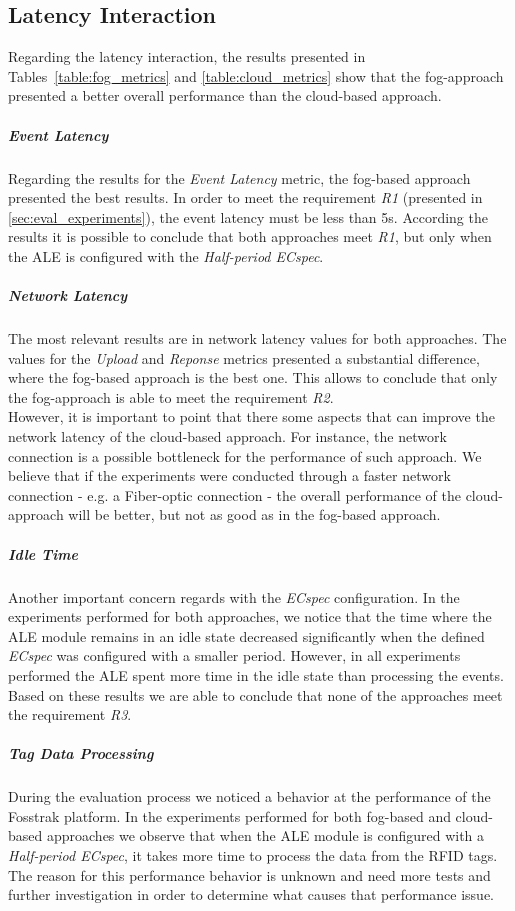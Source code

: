 \subsection{Latency Interaction}
\label{subs:eval_results_latency}
Regarding the latency interaction, the results presented in Tables~\ref{table:fog_metrics} and
\ref{table:cloud_metrics} show that the fog-approach presented a better overall performance than
the cloud-based approach.

\subparagraph{Event Latency}
\label{subp:eval_event_latency}
Regarding the results for the \textit{Event Latency} metric, the fog-based approach presented the
best results. In order to meet the requirement \textit{R1} (presented in \ref{sec:eval_experiments}),
the event latency must be less than 5s. According the results it is possible to conclude that both
approaches meet \textit{R1}, but only when the \gls{ALE} is configured with the \textit{Half-period ECspec}.

\subparagraph{Network Latency}
\label{subp:eval_network_latency}
The most relevant results are in network latency values for both approaches. The values for the \textit{Upload}
and \textit{Reponse} metrics presented a substantial difference, where the fog-based approach is the
best one. This allows to conclude that only the fog-approach is able to meet the requirement \textit{R2}.\\

However, it is important to point that there some aspects that can improve the network latency
of the cloud-based approach. For instance, the network connection is a possible bottleneck for the
performance of such approach. We believe that if the experiments were conducted through a faster
network connection - e.g. a Fiber-optic connection - the overall performance of the cloud-approach
will be better, but not as good as in the fog-based approach.

\subparagraph{Idle Time}
\label{subp:eval_idle_time}
Another important concern regards with the \textit{ECspec} configuration. In the experiments
performed for both approaches, we notice that the time where the \gls{ALE} module remains in an idle
state decreased significantly when the defined \textit{ECspec} was configured with a smaller period.
However, in all experiments performed the \gls{ALE} spent more time in the idle state than
processing the events. Based on these results we are able to conclude that none of the approaches
meet the requirement \textit{R3}.

\subparagraph{Tag Data Processing}
\label{subp:eval_tag_processing}
During the evaluation process we noticed a behavior at the performance of the Fosstrak platform.
In the experiments performed for both fog-based and cloud-based approaches we observe that when
the \gls{ALE} module is configured with a \textit{Half-period ECspec}, it takes more time to
process the data from the \gls{RFID} tags. The reason for this performance behavior is unknown and
need more tests and further investigation in order to determine what causes that performance issue.

